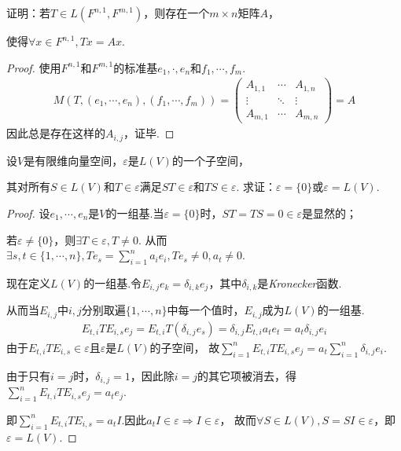 \begin{problem}[15]\label{3.D.15}
    证明：若\(T \in L(F^{n,1},F^{m,1})\)，则存在一个\(m \times n\)矩阵\(A\)，
    
    使得\(\forall x \in F^{n,1},Tx=Ax\).
\end{problem}

\begin{proof}
    使用\(F^{n,1}\)和\(F^{m,1}\)的标准基\(e_1,\cdot,e_n\)和\(f_1,\cdots,f_m\).
    \begin{align*}
        M(T,(e_1,\cdots,e_n),(f_1,\cdots,f_m))=
            \begin{pmatrix}
                A_{1,1} & \cdots & A_{1,n}  \\
                \vdots  & \ddots & \vdots   \\
                A_{m,1} & \cdots & A_{m,n}
            \end{pmatrix}
        =A
    \end{align*}
    因此总是存在这样的\(A_{i,j}\)，证毕.
\end{proof}

\begin{problem}[17]\label{3.D.17}
    设\(V\)是有限维向量空间，\(\varepsilon\)是\(L(V)\)的一个子空间，

    其对所有\(S \in L(V)\)和\(T \in \varepsilon\)满足\(ST \in \varepsilon\)和\(TS \in \varepsilon\).
    求证：\(\varepsilon=\{0\}\)或\(\varepsilon=L(V)\).    
\end{problem}

\begin{proof}
    设\(e_1,\cdots,e_n\)是\(V\)的一组基.当\(\varepsilon =\{0\}\)时，\(ST=TS=0 \in \varepsilon\)是显然的；

    若\(\varepsilon \ne \{0\}\)，则\(\exists T \in \varepsilon, T \ne 0\).
    从而\(\exists s,t \in \{1,\cdots,n\},Te_s=\sum_{i=1}^n a_ie_i ,Te_s \ne 0, a_t \ne 0\).
    
    现在定义\(L(V)\)的一组基.令\(E_{i,j}e_k=\delta_{i,k}e_j\)，其中\(\delta_{i,k}\)是\textit{Kronecker}函数.
    
    从而当\(E_{i,j}\)中\(i,j\)分别取遍\(\{1,\cdots,n\}\)中每一个值时，\(E_{i,j}\)成为\(L(V)\)的一组基.
    \begin{align*}
        E_{t,i}TE_{i,s}e_j=E_{t,i}T(\delta_{i,j} e_s)=\delta_{i,j}E_{t,i}a_te_t=a_t\delta_{i,j}e_i
    \end{align*}
    由于\(E_{t,i}TE_{i,s} \in \varepsilon\)且\(\varepsilon\)是\(L(V)\)的子空间，
    故\(\sum_{i=1}^n E_{t,i}TE_{i,s}e_j=a_t \sum_{i=1}^n \delta_{i,j}e_i\).
    
    由于只有\(i=j\)时，\(\delta_{i,j}=1\)，因此除\(i=j\)的其它项被消去，得\(\sum_{i=1}^n E_{t,i}TE_{i,s} e_j=a_te_j\).
    
    即\(\sum_{i=1}^n E_{t,i} T E_{i,s} =a_t I\).因此\(a_t I \in \varepsilon \Rightarrow I \in \varepsilon\)，
    故而\(\forall S \in L(V),S=SI \in \varepsilon\)，即\(\varepsilon=L(V)\).
\end{proof}

